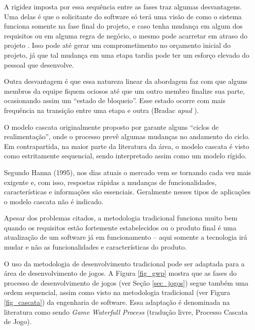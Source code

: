 \documentclass[quali]{ppgccufscar}
\begin{document}
A rigidez imposta por essa sequência entre as fases traz algumas desvantagens. Uma delas é que o solicitante do software só terá uma visão de como o sistema funciona somente na fase final do projeto, e caso tenha mudança em algum dos requisitos ou em alguma regra de negócio, o mesmo pode acarretar em atraso do projeto \cite{pressman2005}. Isso pode até gerar um comprometimento no orçamento inicial do projeto, já que tal mudança em uma etapa tardia pode ter um esforço elevado do pessoal que desenvolve.

Outra desvantagem é que essa natureza linear da abordagem faz com que alguns membros da equipe fiquem ociosos até que um outro membro finalize sua parte, ocasionando assim um “estado de bloqueio”. Esse estado ocorre com mais frequência na transição entre uma etapa e outra (Bradac \textit{apud} ).

O modelo cascata originalmente proposto por  garante alguns “ciclos de realimentação”, onde o processo prevê algumas mudanças no andamento do ciclo. Em contrapartida, na maior parte da literatura da área, o modelo cascata é visto como estritamente sequencial, sendo interpretado assim como um modelo rígido.

Segundo Hanna (1995), nos dias atuais o mercado vem se tornando cada vez mais exigente e, com isso, respostas rápidas a mudanças de funcionalidades, características e informações são essenciais. Geralmente nesses tipos de aplicações o modelo cascata não é indicado.

Apesar dos problemas citados, a metodologia tradicional funciona muito bem quando os requisitos estão fortemente estabelecidos ou o produto final é uma atualização de um software já em funcionamento -- aqui somente a tecnologia irá mudar e não as funcionalidades e características do produto.

O uso da metodologia de desenvolvimento tradicional pode ser adaptada para a área de desenvolvimento de jogos. A Figura \ref{fig_gwp} mostra que as fases do processo de desenvolvimento de jogos (ver Seção \ref{sec_jogos}) segue também uma ordem sequencial, assim como visto na metodologia tradicional (ver Figura \ref{fig_cascata}) da engenharia de software. Essa adaptação é denominada na literatura como sendo \textit{Game Waterfall Process} (tradução livre, Processo Cascata de Jogo). 
\end{document}
